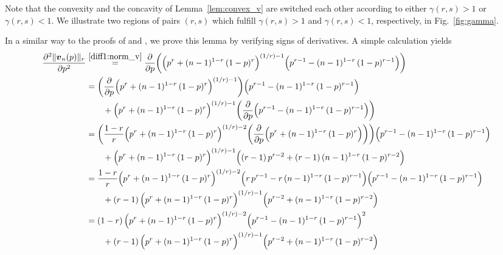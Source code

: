 \documentclass[conference, draftcls, onecolumn]{IEEEtran}
\theoremstyle{plain}
\newcommand{\bvec}[1]{\boldsymbol{#1}}
\newcommand{\figref}[1]{Fig.~\ref{#1}}
\newcommand{\lemref}[1]{Lemma~\ref{#1}}
\begin{document}
Note that the convexity and the concavity of \lemref{lem:convex_v} are switched each other according to either $\gamma(r, s) > 1$ or $\gamma(r, s) < 1$.
We illustrate two regions of pairs $(r, s)$ which fulfill $\gamma(r, s) > 1$ and $\gamma(r, s) < 1$, respectively, in \figref{fig:gamma}.




\begin{IEEEproof}[Proof of \lemref{lem:convex_v}]
In a similar way to the proofs of \cite[Lemma~1]{fabregas} and \cite[Lemma~2]{part2}, we prove this lemma by verifying signs of derivatives.
A simple calculation yields
\begin{align}
\frac{ \partial^{2} \| \bvec{v}_{n}( p ) \|_{r} }{ \partial p^{2} }
& \overset{\eqref{diff1:norm_v}}{=}
\frac{ \partial }{ \partial p } \bigg( \Big( p^{r} + (n-1)^{1-r} \, (1-p)^{r} \Big)^{(1/r)-1} \Big( p^{r-1} - (n-1)^{1-r} \, (1-p)^{r-1} \Big) \bigg)
\\
& =
\bigg( \frac{ \partial }{ \partial p } \Big( p^{r} + (n-1)^{1-r} \, (1-p)^{r} \Big)^{(1/r) - 1} \bigg) \Big( p^{r-1} - (n-1)^{1-r} \, (1-p)^{r-1} \Big)
\notag \\
& \qquad
+ \Big( p^{r} + (n-1)^{1-r} \, (1-p)^{r} \Big)^{(1/r) - 1} \bigg( \frac{ \partial }{ \partial p } \Big( p^{r-1} - (n-1)^{1-r} \, (1-p)^{r-1} \Big) \bigg)
\\
& =
\bigg( \frac{ 1 - r }{ r } \Big( p^{r} + (n-1)^{1-r} \, (1-p)^{r} \Big)^{(1/r) - 2} \bigg( \frac{ \partial }{ \partial p } \Big( p^{r} + (n-1)^{1-r} \, (1-p)^{r} \Big) \bigg) \bigg) \Big( p^{r-1} - (n-1)^{1-r} \, (1-p)^{r-1} \Big)
\notag \\
& \qquad
+ \Big( p^{r} + (n-1)^{1-r} \, (1-p)^{r} \Big)^{(1/r) - 1} \Big( (r-1) \, p^{r-2} + (r-1) \, (n-1)^{1-r} \, (1-p)^{r-2} \Big)
\\
& =
\frac{ 1 - r }{ r } \Big( p^{r} + (n-1)^{1-r} \, (1-p)^{r} \Big)^{(1/r) - 2} \Big( r \, p^{r-1} - r \, (n-1)^{1-r} \, (1-p)^{r-1} \Big) \Big( p^{r-1} - (n-1)^{1-r} \, (1-p)^{r-1} \Big)
\notag \\
& \qquad
+ (r-1) \, \Big( p^{r} + (n-1)^{1-r} \, (1-p)^{r} \Big)^{(1/r) - 1} \Big( p^{r-2} + (n-1)^{1-r} \, (1-p)^{r-2} \Big)
\\
& =
(1-r) \, \Big( p^{r} + (n-1)^{1-r} \, (1-p)^{r} \Big)^{(1/r) - 2} \Big( p^{r-1} - (n-1)^{1-r} \, (1-p)^{r-1} \Big)^{2}
\notag \\
& \qquad
+ (r-1) \, \Big( p^{r} + (n-1)^{1-r} \, (1-p)^{r} \Big)^{(1/r) - 1} \Big( p^{r-2} + (n-1)^{1-r} \, (1-p)^{r-2} \Big)
\\

\end{align}
\end{IEEEproof}
\end{document}
